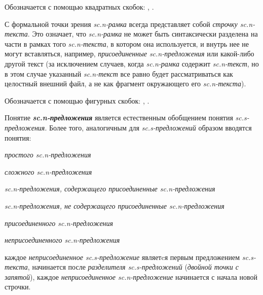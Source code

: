 \begin{SCn}
\end{SCn}

Обозначается с помощью квадратных скобок: \scnqqi{ [ }, \scnqqi{ ] }.

С формальной точки зрения \textit{sc.n-рамка} всегда представляет собой  \textit{строчку sc.n-текста}. Это означает, что \textit{sc.n-рамка} не может быть синтаксически разделена на части в рамках того \textit{sc.n-текста}, в котором она используется, и внутрь нее не могут вставляться, например, \textit{присоединенные sc.n-предложения} или какой-либо другой текст (за исключением случаев, когда \textit{sc.n-рамка} содержит \textit{sc.n-текст}, но в этом случае указанный \textit{sc.n-текст} все равно будет рассматриваться как целостный внешний файл, а не как фрагмент окружающего его \textit{sc.n-текста}). 

\begin{SCn}
\end{SCn}

Обозначается с помощью фигурных скобок: \scnqqi{ \textbraceleft }, \scnqqi{ \textbraceright } .

Понятие \textbf{\textit{sc.n-предложения}} является естественным обобщением понятия \textit{sc.s-предложения}. Более того, аналогичным для \textit{sc.s-предложений} образом вводятся понятия:
\begin{textitemize}
	\item \textit{простого sc.n-предложения}
	\item \textit{сложного sc.n-предложения}
	\item \textit{sc.n-предложения, содержащего присоединенные sc.n-предложения}
	\item \textit{sc.n-предложения, не содержащего присоединенные sc.n-предложения}
	\item \textit{присоединенного sc.n-предложения}
	\item \textit{неприсоединенного sc.n-предложения}
\end{textitemize}

 каждое \textit{неприсоединенное sc.s-предложение}  являетcя первым предложением \textit{sc.s-текста},  начинается после \textit{разделителя sc.s-предложений} (\textit{двойной точки с запятой}),  каждое \textit{неприсоединенное sc.n-предложение} начинается с начала новой строчки.

